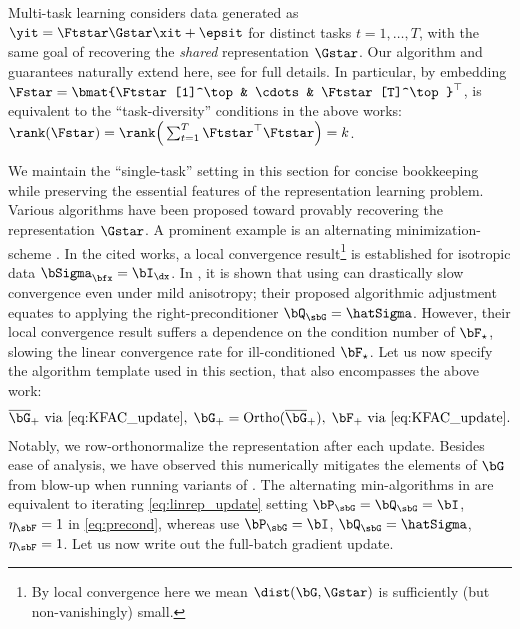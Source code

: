 \begin{remark}\label{rem:multitask}
    Multi-task learning considers data generated as $\yit = \Ftstar \Gstar \xit + \epsit$ for distinct tasks $t = 1,\dots, T$, with the same goal of recovering the \textit{shared} representation $\Gstar$. Our algorithm and guarantees naturally extend here, see  for full details. In particular, by embedding $\Fstar = \bmat{\Ftstar[1]^\top & \cdots & \Ftstar[T]^\top}^\top$,  is equivalent to the ``task-diversity'' conditions in the above works: $\rank(\Fstar) = \rank\Big(\sum_{t=1}^T \Ftstar^\top \Ftstar \Big) = k$.
\end{remark}
We maintain the ``single-task'' setting in this section for concise bookkeeping while preserving the essential features of the representation learning problem.
Various algorithms have been proposed toward provably recovering the representation $\Gstar$. A prominent example is an alternating minimization-\SGD scheme \citep{collins2021exploiting, vaswani2024efficient}.
In the cited works, a local convergence result\footnote{By local convergence here we mean $\dist(\bG, \Gstar)$ is sufficiently (but non-vanishingly) small.} is established for isotropic data $\bSigma_\bfx = \bI_{\dx}$. In \citet{zhang2023meta}, it is shown that using \SGD  can drastically slow convergence even under mild anisotropy; their proposed algorithmic adjustment equates to applying the right-preconditioner $\bQ_\sbG = \hatSigma$. However, their local convergence result suffers a dependence on the condition number of $\bF_\star$, slowing the linear convergence rate for ill-conditioned $\bF_\star$.
Let us now specify the algorithm template used in this section, that also encompasses the above work:
\begin{align}\label{eq:linrep_update}
    \overline\bG_+ \text{ via \eqref{eq:KFAC_update}},\; \bG_+ = \mathrm{Ortho}(\overline\bG_+),\; \bF_+ \text{ via \eqref{eq:KFAC_update}}.
\end{align}
Notably, we row-orthonormalize the representation after each update. Besides ease of analysis, we have observed this numerically mitigates the elements of $\bG$ from blow-up when running variants of \SGD. The alternating min-\SGD algorithms in \citet{collins2021exploiting, vaswani2024efficient} are equivalent to iterating \eqref{eq:linrep_update} setting $\bP_\sbG = \bQ_\sbG = \bI$, $\eta_\sbF = 1$ in \eqref{eq:precond}, whereas \citet{zhang2023meta} use $\bP_\sbG = \bI$, $\bQ_\sbG = \hatSigma$, $\eta_\sbF = 1$. 
Let us now write out the full-batch gradient update.

